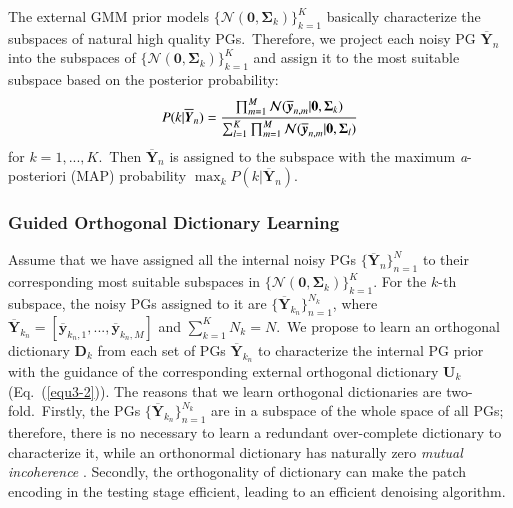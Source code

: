 The external GMM prior models $\{\mathcal{N}(\bm{0},\bm{\Sigma}_{k})\}_{k=1}^{K}$ basically characterize the subspaces of natural high quality PGs.\ Therefore, we project each noisy PG $\bm{\overline{Y}}_{n}$ into the subspaces of $\{\mathcal{N}(\bm{0},\bm{\Sigma}_{k})\}_{k=1}^{K}$ and assign it to the most suitable subspace based on the posterior probability:
\vspace{-2mm}
\begin{equation}\label{equ3-3}
\vspace{-2mm}
P(k|\bm{\overline{Y}}_{n})=\frac{\prod_{m=1}^{M}\mathcal{N}(\bm{\overline{y}}_{n,m}|\bm{0},\bm{\Sigma}_{k})}{\sum_{l=1}^{K}\prod_{m=1}^{M}\mathcal{N}(\bm{\overline{y}}_{n,m}|\bm{0},\bm{\Sigma}_{l})}
\end{equation}
for $k=1,...,K$.\ Then $\bm{\overline{Y}}_{n}$ is assigned to the subspace with the maximum \emph{a}-posteriori (MAP) probability $\max_{k}P(k|\bm{\overline{Y}}_{n})$.


\subsubsection{Guided Orthogonal Dictionary Learning}

Assume that we have assigned all the internal noisy PGs $\{\bm{\overline{Y}}_{n}\}_{n=1}^{N}$ to their corresponding most suitable subspaces in $\{\mathcal{N}(\bm{0},\bm{\Sigma}_{k})\}_{k=1}^{K}$. For the $k$-th subspace, the noisy PGs assigned to it are $\{\bm{\overline{Y}}_{k_{n}}\}_{n=1}^{N_{k}}$, where $\bm{\overline{Y}}_{k_{n}}=[\bm{\overline{y}}_{k_{n},1},...,\bm{\overline{y}}_{k_{n},M}]$ and $\sum_{k=1}^{K}N_{k}=N$.\ We propose to learn an orthogonal dictionary $\bm{D}_{k}$ from each set of PGs $\bm{\overline{Y}}_{k_{n}}$ to characterize the internal PG prior with the guidance of the corresponding external orthogonal dictionary $\bm{U}_{k}$ (Eq.\ (\ref{equ3-2})). The reasons that we learn orthogonal dictionaries are two-fold.\ Firstly, the PGs $\{\bm{\overline{Y}}_{k_{n}}\}_{n=1}^{N_{k}}$ are in a subspace of the whole space of all PGs; therefore, there is no necessary to learn a redundant over-complete dictionary to characterize it, while an orthonormal dictionary has naturally zero \emph{mutual incoherence} \cite{donoho2001uncertainty}. Secondly, the orthogonality of dictionary can make the patch encoding in the testing stage efficient, leading to an efficient denoising algorithm.

